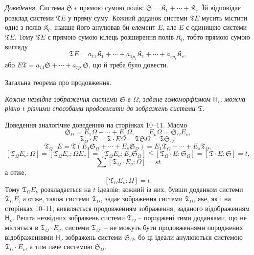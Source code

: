 \documentclass[11pt]{article}
\begin{document}
\emph{Доведення.} Система \(\mathfrak S\) є прямою сумою полів: \(\mathfrak S=\mathfrak K_1+\cdots+\mathfrak K_\gamma\). Їй відповідає розклад системи \(\mathfrak T E\) у пряму суму. Кожний доданок системи \(\mathfrak T E\) мусить містити одне з полів \(\mathfrak K_i\), інакше його анулював би елемент \(E\), але \(E\) є одиницею системи \(\mathfrak T E\). Тому \(\mathfrak T E\) є прямою сумою кілець розширення полів \(\mathfrak K_i\), тобто прямою сумою вигляду
\[
\mathfrak T E=a_{11}\mathfrak K_1+\cdots+a_{1p_1}\mathfrak K_1+\cdots+a_{rp_r}\mathfrak K_r,
\]
або \(E\mathfrak T=a_{11}\mathfrak S+\cdots+a_{rp_r}\mathfrak S\), що й треба було довести.

\begin{center}
Загальна теорема про продовження.
\end{center}

\emph{Кожне незвідне зображення системи \(\mathfrak S\) в \(\Omega\), задане гомоморфізмом \(\mathsf{H}_i\), можна рівно \(t\) різними способами продовжити до зображень системи \(\mathfrak T\).}

Доведення аналогічне доведенню на сторінках 10--11. Маємо
\[
\mathfrak S_\Omega=E_1\Omega+\cdots+E_s\Omega,\qquad
E_\nu\Omega=\mathfrak S_\Omega E_\nu,
\]
\[
\mathfrak T_\Omega\cdot E=\mathfrak T\cdot E\Omega
=\mathfrak T\mathfrak S\Omega=\mathfrak T\mathfrak S_\Omega,
\]
\[
\mathfrak T_\Omega\cdot E
=\mathfrak T(E_1\mathfrak S_\Omega+\cdots+E_s\mathfrak S_\Omega)
=E_1\mathfrak T_\Omega+\cdots+E_s\mathfrak T_\Omega,
\]
\[
[\mathfrak T_\Omega E_\nu:\Omega]
=[\mathfrak T_\Omega E_\nu:\Omega E_\nu]
=[\mathfrak T_\Omega E_\nu:E_\nu\mathfrak S_\Omega]
\leqq[\mathfrak T_\Omega\cdot E:\mathfrak S_\Omega]
=[\mathfrak T\cdot E:\mathfrak S]=t,
\]
\[
\sum[\mathfrak T_\Omega\cdot E_\nu:\Omega]=st
\]
а отже,
\[
[\mathfrak T_\Omega E_\nu:\Omega]=t.
\]
Тому \(\mathfrak T_\Omega E_\nu\) розкладається на \(t\) ідеалів; кожний із них, бувши доданком системи \(\mathfrak T_\Omega E\), а отже, також системи \(\mathfrak T_\Omega\), задає зображення системи \(\mathfrak T_\Omega\), яке, як і на сторінках 10--11, виявляється продовженням зображення, заданого відображенням \(\mathsf{H}_\nu\). Решта незвідних зображень системи \(\mathfrak T_\Omega\) -- породжені тими доданками, що не містяться в \(\mathfrak T_\Omega\cdot E_\nu\), системи \(\mathfrak T_\Omega\), -- не можуть бути продовженнями породжених відображеннями \(\mathsf{H}_\nu\) зображень системи \(\mathfrak S_\Omega\), бо ці ідеали анулюються системою \(\mathfrak T_\Omega\cdot E_\nu\), а тим паче системою \(\mathfrak S_\Omega\).
\end{document}
